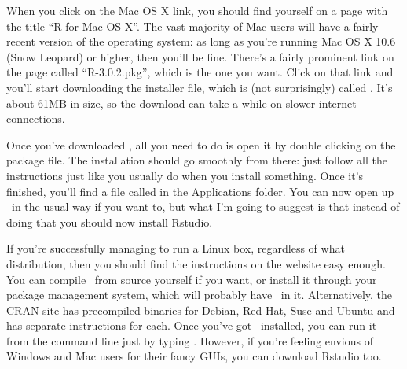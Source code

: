 
When you click on the Mac OS X link, you should find yourself on a page with the title ``R for Mac OS X''. The vast majority of Mac users will have a fairly recent version of the operating system: as long as you're running Mac OS X 10.6 (Snow Leopard) or higher, then you'll be fine. There's a fairly prominent link on the page called ``R-3.0.2.pkg'', which is the one you want. Click on that link and you'll start downloading the installer file, which is (not surprisingly) called . It's about 61MB in size, so the download can take a while on slower internet connections. 

Once you've downloaded , all you need to do is open it by double clicking on the package file. The installation should go smoothly from there: just follow all the instructions just like you usually do when you install something. Once it's finished, you'll find a file called  in the Applications folder. You can now open up \R\ in the usual way if you want to, but what I'm going to suggest is that instead of doing that you should now install Rstudio. 


If you're successfully managing to run a Linux box, regardless of what distribution, then you should find the instructions on the website easy enough. You can compile \R\ from source yourself if you want, or install it through your package management system, which will probably have \R\ in it. 
Alternatively, the CRAN site has precompiled binaries for Debian, Red Hat, Suse and Ubuntu and has separate instructions for each. Once you've got \R\ installed, you can run it from the command line just by typing . However, if you're feeling envious of Windows and Mac users for their fancy GUIs, you can download Rstudio too.


